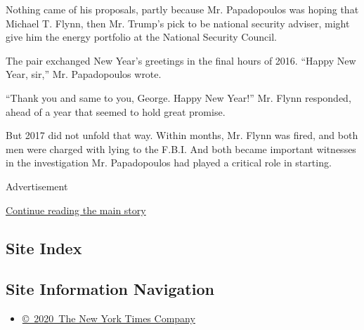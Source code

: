 Nothing came of his proposals, partly because Mr. Papadopoulos was
hoping that Michael T. Flynn, then Mr. Trump's pick to be national
security adviser, might give him the energy portfolio at the National
Security Council.

The pair exchanged New Year's greetings in the final hours of 2016.
``Happy New Year, sir,'' Mr. Papadopoulos wrote.

``Thank you and same to you, George. Happy New Year!'' Mr. Flynn
responded, ahead of a year that seemed to hold great promise.

But 2017 did not unfold that way. Within months, Mr. Flynn was fired,
and both men were charged with lying to the F.B.I. And both became
important witnesses in the investigation Mr. Papadopoulos had played a
critical role in starting.

Advertisement

\protect\hyperlink{after-bottom}{Continue reading the main story}

\hypertarget{site-index}{%
\subsection{Site Index}\label{site-index}}

\hypertarget{site-information-navigation}{%
\subsection{Site Information
Navigation}\label{site-information-navigation}}

\begin{itemize}
\tightlist
\item
  \href{https://help.nytimes.com/hc/en-us/articles/115014792127-Copyright-notice}{©~2020~The
  New York Times Company}
\end{itemize}

